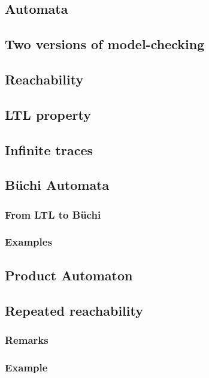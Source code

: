 \documentclass[12pt, a4paper]{book}
\begin{document}
  \subsection{Automata}
  \label{sub:Automata}
  \subsection{Two versions of model-checking}
  \label{sub:Two versions of model-checking}
  \subsection{Reachability}
  \label{sub:Reachability}
  \subsection{LTL property}
  \label{sub:LTL property}
  \subsection{Infinite traces}
  \label{sub:Infinite traces}
  \subsection{Büchi Automata}
  \label{sub:Büchi Automata}
  \subsubsection{From LTL to Büchi}
  \label{subs:From LTL to Büchi}
  \subsubsection{Examples}
  \label{subs:Examples}
  \subsection{Product Automaton}
  \label{sub:Product Automaton}
  \subsection{Repeated reachability}
  \label{sub:Repeated reachability}
  \subsubsection{Remarks}
  \label{subs:Remarks}
  \subsubsection{Example}
  \label{subs:Example}
\end{document}
